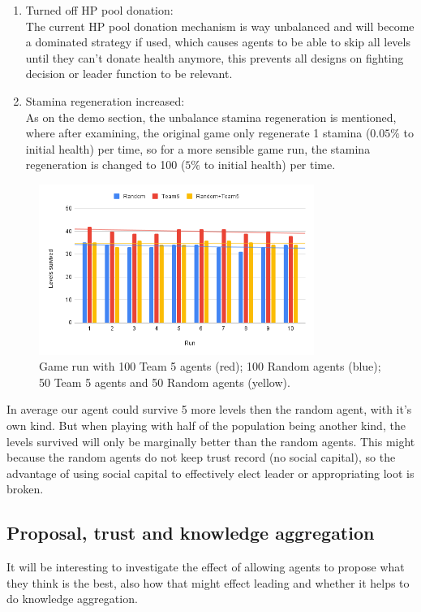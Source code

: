 \begin{enumerate}
    \item Turned off HP pool donation: \\
    The current HP pool donation mechanism is way unbalanced and will become a dominated strategy if used, which causes agents to be able to skip all levels until they can't donate health anymore, this prevents all designs on fighting decision or leader function to be relevant.
    \item Stamina regeneration increased: \\
    As on the demo section, the unbalance stamina regeneration is mentioned, where after examining, the original game only regenerate 1 stamina ($0.05\%$ to initial health) per time, so for a more sensible game run, the stamina regeneration is changed to 100 ($5\%$ to initial health) per time.
\end{enumerate}

\begin{figure}[!ht]
    \centering
    \includegraphics[width=0.8\textwidth]{008_team_5_agent_design/images/Team5vsRandom.png}
    \caption{Game run with 100 Team 5 agents (red); 100 Random agents (blue); 50 Team 5 agents and 50 Random agents (yellow).}
    \label{fig:Team5vsRandom}
\end{figure}

In average our agent could survive 5 more levels then the random agent, with it's own kind. But when playing with half of the population being another kind, the levels survived will only be marginally better than the random agents. This might because the random agents do not keep trust record (no social capital), so the advantage of using social capital to effectively elect leader or appropriating loot is broken.

\subsection{Proposal, trust and knowledge aggregation}
It will be interesting to investigate the effect of allowing agents to propose what they think is the best, also how that might effect leading and whether it helps to do knowledge aggregation.

